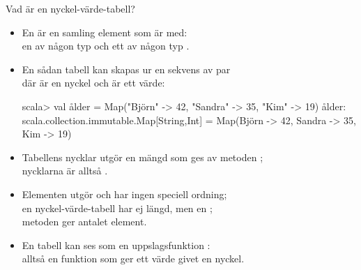 

\begin{Slide}{Vad är en nyckel-värde-tabell?}\SlideFontSmall
\begin{itemize}
\item En  är en samling element som är  med:\\
en  av någon typ  och ett  av någon typ .
\item En sådan tabell kan skapas ur en sekvens av par \\
där  är en nyckel och  är ett värde:
\begin{REPL}
scala> val ålder = Map("Björn" -> 42, "Sandra" -> 35, "Kim" -> 19)
ålder: scala.collection.immutable.Map[String,Int] =
  Map(Björn -> 42, Sandra -> 35, Kim -> 19)
\end{REPL}
\item Tabellens nycklar utgör en mängd som ges av metoden ;\\
nycklarna är alltså .
\item Elementen utgör  och har ingen speciell ordning;
\\en nyckel-värde-tabell har ej längd, men en ;\\metoden {} ger antalet element.
\pause
\item En tabell kan ses som en uppslagsfunktion :\\alltså en funktion  som ger ett värde givet en nyckel.
\end{itemize}
\end{Slide}

%
%
%
%




